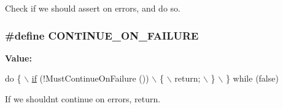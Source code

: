 Check if we should assert on errors, and do so. 

\subsubsection[{\texorpdfstring{C\+O\+N\+T\+I\+N\+U\+E\+\_\+\+O\+N\+\_\+\+F\+A\+I\+L\+U\+RE}{CONTINUE_ON_FAILURE}}]{\setlength{\rightskip}{0pt plus 5cm}\#define C\+O\+N\+T\+I\+N\+U\+E\+\_\+\+O\+N\+\_\+\+F\+A\+I\+L\+U\+RE}\hypertarget{group__testing_ga6f2bed856695445564c93cd367c69ea0}{}\label{group__testing_ga6f2bed856695445564c93cd367c69ea0}
{\bfseries Value\+:}
\begin{DoxyCode}
\textcolor{keywordflow}{do} \{                                                                  \hyperlink{loss__ITU1238_8m_a419d895abe1313c35fa353c93802647e}{\(\backslash\)}
\hyperlink{loss__ITU1238_8m_a419d895abe1313c35fa353c93802647e}{    if} (!MustContinueOnFailure ())                                      \(\backslash\)
      \{                                                                 \(\backslash\)
        return;                                                         \(\backslash\)
      \}                                                                 \(\backslash\)
  \} \textcolor{keywordflow}{while} (\textcolor{keyword}{false})
\end{DoxyCode}


If we shouldn\textquotesingle{}t continue on errors, return. 

